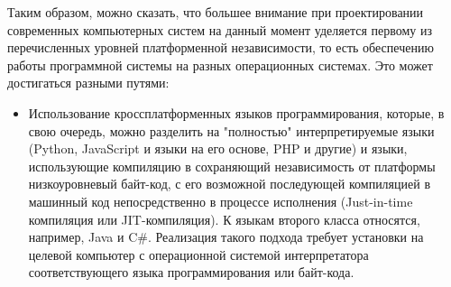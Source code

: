 Таким образом, можно сказать, что большее внимание при проектировании современных компьютерных систем на данный момент уделяется первому из перечисленных уровней платформенной независимости, то есть обеспечению работы программной системы на разных операционных системах. Это может достигаться разными путями:
\begin{itemize}
	\item Использование кроссплатформенных языков программирования, которые, в свою очередь, можно разделить на "полностью"{} интерпретируемые языки (Python, JavaScript и языки на его основе, PHP и другие) и языки, использующие компиляцию в сохраняющий независимость от платформы низкоуровневый байт-код, с его возможной последующей компиляцией в машинный код непосредственно в процессе исполнения (Just-in-time компиляция или JIT-компиляция). К языкам второго класса относятся, например, Java и C\#. Реализация такого подхода требует установки на целевой компьютер с операционной системой интерпретатора соответствующего языка программирования или байт-кода.
	

\end{itemize}
